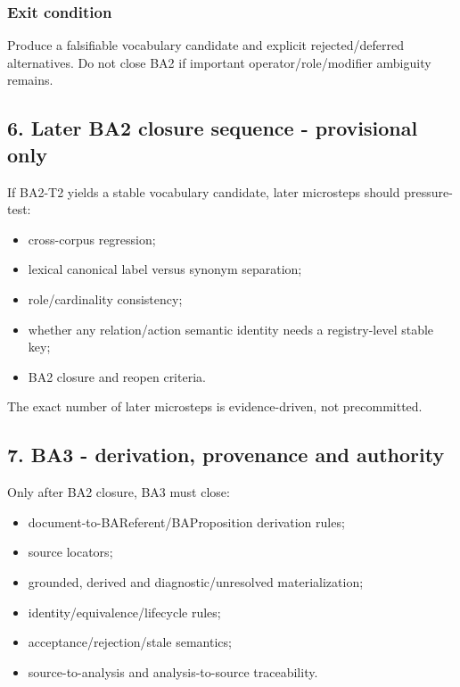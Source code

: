 \documentclass[
  10pt,
  letterpaper,
]{article}
\providecommand{\tightlist}{%
  \setlength{\itemsep}{0pt}\setlength{\parskip}{0pt}}
\begin{document}
\subsubsection{Exit condition}\label{exit-condition}

Produce a falsifiable vocabulary candidate and explicit
rejected/deferred alternatives. Do not close BA2 if important
operator/role/modifier ambiguity remains.

\subsection{6. Later BA2 closure sequence - provisional
only}\label{later-ba2-closure-sequence---provisional-only}

If BA2-T2 yields a stable vocabulary candidate, later microsteps should
pressure-test:

\begin{itemize}
\tightlist
\item
  cross-corpus regression;
\item
  lexical canonical label versus synonym separation;
\item
  role/cardinality consistency;
\item
  whether any relation/action semantic identity needs a registry-level
  stable key;
\item
  BA2 closure and reopen criteria.
\end{itemize}

The exact number of later microsteps is evidence-driven, not
precommitted.

\subsection{7. BA3 - derivation, provenance and
authority}\label{ba3---derivation-provenance-and-authority}

Only after BA2 closure, BA3 must close:

\begin{itemize}
\tightlist
\item
  document-to-BAReferent/BAProposition derivation rules;
\item
  source locators;
\item
  grounded, derived and diagnostic/unresolved materialization;
\item
  identity/equivalence/lifecycle rules;
\item
  acceptance/rejection/stale semantics;
\item
  source-to-analysis and analysis-to-source traceability.
\end{itemize}
\end{document}
